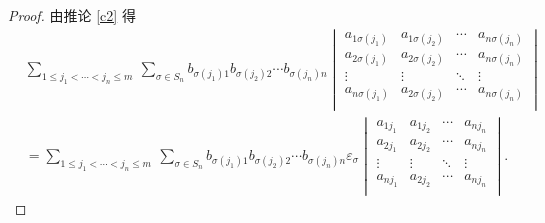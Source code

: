 \documentclass[color=black,device=normal,lang=cn,mode=geye]{elegantnote}
\begin{document}
\begin{proof}
    由推论 \ref{c2} 得
    \begin{align*}
        & \sum\limits_{1\leq j_1<\cdots<j_n\leq m}\ \sum_{\sigma\in S_n}b_{\sigma(j_1)1}b_{\sigma(j_2)2}\cdots b_{\sigma(j_n)n}\begin{vmatrix}
            a_{1\sigma(j_1)} & a_{1\sigma(j_2)} & \cdots & a_{n\sigma(j_n)} \\
            a_{2\sigma(j_1)} & a_{2\sigma(j_2)} & \cdots & a_{n\sigma(j_n)} \\
            \vdots & \vdots & \ddots & \vdots \\
            a_{n\sigma(j_1)} & a_{2\sigma(j_2)} & \cdots & a_{n\sigma(j_n)} \\
        \end{vmatrix} \\
        & =\sum\limits_{1\leq j_1<\cdots<j_n\leq m}\ \sum_{\sigma\in S_n}b_{\sigma(j_1)1}b_{\sigma(j_2)2}\cdots b_{\sigma(j_n)n}\varepsilon_\sigma\begin{vmatrix}
            a_{1j_1} & a_{1j_2} & \cdots & a_{nj_n} \\
            a_{2j_1} & a_{2j_2} & \cdots & a_{nj_n} \\
            \vdots & \vdots & \ddots & \vdots \\
            a_{nj_1} & a_{2j_2} & \cdots & a_{nj_n} \\
        \end{vmatrix}.
    \end{align*}


\end{proof}
\end{document}
